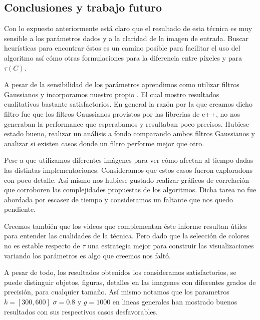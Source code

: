 \subsection{Conclusiones y trabajo futuro}

Con lo expuesto anteriormente está claro que el resultado de esta técnica es
muy sensible a los parámetros dados y a la claridad de la imagen de entrada.
Buscar heurísticas para encontrar éstos es un camino posible para facilitar el
uso del algoritmo así cómo otras formulaciones para la diferencia entre píxeles
y para $\tau(C)$.

A pesar de la sensibilidad de los parámetros aprendimos como utilizar filtros Gaussianos y incorporamos nuestro propio \sigma. El cual mostro resultados cualitativos bastante satisfactorios. En general la razón por la que creamos dicho filtro fue que los filtros Gaussianos provistos por las librerias de c++, no nos generaban la performance que esperabamos y resultaban poco precisos. Hubiese estado bueno, realizar un análisis a fondo comparando ambos filtros Gaussianos y analizar si existen casos donde un filtro performe mejor que otro. 

Pese a que utilizamos diferentes imágenes para ver cómo afectan al tiempo dadas las distintas implementaciones. Consideramos que estos casos fueron exploradons con poco detalle. Así mismo nos hubiese gustado realizar gráficos de correlación que corroboren las complejidades propuestas de los algoritmos. Dicha tarea no fue abordada por escasez de tiempo y consideramos un faltante que nos quedo pendiente.

Creemos también que los videos que complementan éste informe resultan útiles para entender las cualidades de la técnica. Pero dado que la selección de colores no es estable respecto de $\tau$ una estrategia
mejor para construir las visualizaciones variando los parámetros es algo que creemos nos faltó.

A pesar de todo, los resultados obtenidos los consideramos satisfactorios, se puede distinguir objetos, figuras, detalles en las imagenes con diferentes grados de precisión, para cualquier tamaño. Así mismo notamos que los parametros $k=[300,600]$ $\sigma = 0.8$ y $g = 1000$ en lineas generales han mostrado buenos resultados con sus respectivos casos desfavorables. 
